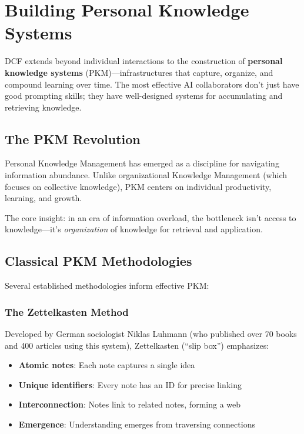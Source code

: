 \chapter{Building Personal Knowledge Systems}

DCF extends beyond individual interactions to the construction of \textbf{personal knowledge systems} (PKM)---infrastructures that capture, organize, and compound learning over time. The most effective AI collaborators don't just have good prompting skills; they have well-designed systems for accumulating and retrieving knowledge.

\section{The PKM Revolution}

Personal Knowledge Management has emerged as a discipline for navigating information abundance. Unlike organizational Knowledge Management (which focuses on collective knowledge), PKM centers on individual productivity, learning, and growth.

The core insight: in an era of information overload, the bottleneck isn't access to knowledge---it's \emph{organization} of knowledge for retrieval and application.

\section{Classical PKM Methodologies}

Several established methodologies inform effective PKM:

\subsection{The Zettelkasten Method}

Developed by German sociologist Niklas Luhmann \cite{luhmann1992kommunikation} (who published over 70 books and 400 articles using this system), Zettelkasten (``slip box'') emphasizes:

\begin{itemize}
    \item \textbf{Atomic notes}: Each note captures a single idea
    \item \textbf{Unique identifiers}: Every note has an ID for precise linking
    \item \textbf{Interconnection}: Notes link to related notes, forming a web
    \item \textbf{Emergence}: Understanding emerges from traversing connections
\end{itemize}

